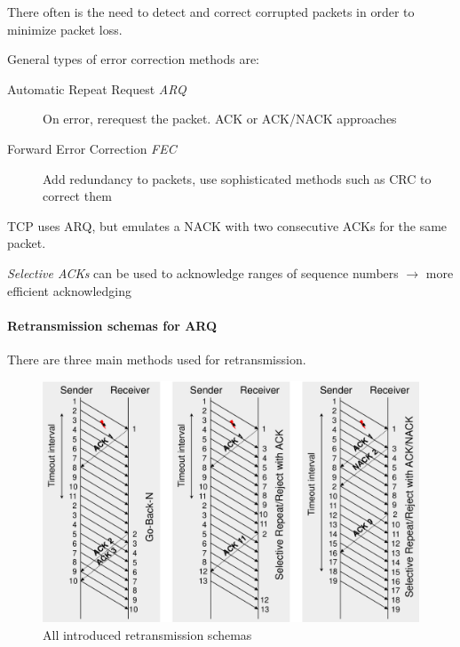 \documentclass[english]{panikzettel}
\begin{document}
	There often is the need to detect and correct corrupted packets in order to minimize packet loss.

	General types of error correction methods are:
	\begin{description}
		\item[Automatic Repeat Request \textit{ARQ}] On error, rerequest the packet. ACK or ACK/NACK approaches
		\item[Forward Error Correction \textit{FEC}] Add redundancy to packets, use sophisticated methods such as CRC to correct them
	\end{description}

	TCP uses ARQ, but emulates a NACK with two consecutive ACKs for the same packet.

	\textit{Selective ACKs} can be used to acknowledge ranges of sequence numbers \( \rightarrow \) more efficient acknowledging

	\paragraph{Retransmission schemas for ARQ}
	\label{pgf-retransmission-schemas-for-arq}
		
	There are three main methods used for retransmission.

	\begin{figure}[H]
		\centering
		\includegraphics[width=\textwidth]{img/2-retransmission-schemas.png}
		\caption{All introduced retransmission schemas}
		\label{img-2-retransmission-schemas}
	\end{figure}
\end{document}
